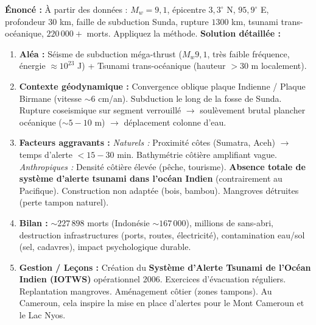\documentclass[11pt]{article}
\begin{document}
\begin{exoresolu}
\textbf{Énoncé :} À partir des données : $M_w = 9,1$, épicentre $3,3^\circ$ N, $95,9^\circ$ E, profondeur $30$ km, faille de subduction Sunda, rupture $1300$ km, tsunami trans-océanique, $220\,000+$ morts. Appliquez la méthode.
\textbf{Solution détaillée :}
\begin{enumerate}
    \item \textbf{Aléa :} Séisme de subduction méga-thrust ($M_w 9,1$, très faible fréquence, énergie $\approx 10^{23}$ J) + Tsunami trans-océanique (hauteur $> 30$ m localement).
    \item \textbf{Contexte géodynamique :} Convergence oblique plaque Indienne / Plaque Birmane (vitesse $\sim 6$ cm/an). Subduction le long de la fosse de Sunda. Rupture coseismique sur segment verrouillé $\rightarrow$ soulèvement brutal plancher océanique ($\sim 5-10$ m) $\rightarrow$ déplacement colonne d'eau.
    \item \textbf{Facteurs aggravants :} \textit{Naturels :} Proximité côtes (Sumatra, Aceh) $\rightarrow$ temps d'alerte $< 15-30$ min. Bathymétrie côtière amplifiant vague. \textit{Anthropiques :} Densité côtière élevée (pêche, tourisme). \textbf{Absence totale de système d'alerte tsunami dans l'océan Indien} (contrairement au Pacifique). Construction non adaptée (bois, bambou). Mangroves détruites (perte tampon naturel).
    \item \textbf{Bilan :} $\sim 227\,898$ morts (Indonésie $\sim 167\,000$), millions de sans-abri, destruction infrastructures (ports, routes, électricité), contamination eau/sol (sel, cadavres), impact psychologique durable.
    \item \textbf{Gestion / Leçons :} Création du \textbf{Système d'Alerte Tsunami de l'Océan Indien (IOTWS)} opérationnel 2006. Exercices d'évacuation réguliers. Replantation mangroves. Aménagement côtier (zones tampons). Au Cameroun, cela inspire la mise en place d'alertes pour le Mont Cameroun et le Lac Nyos.
\end{enumerate}
\end{exoresolu}
\end{document}
